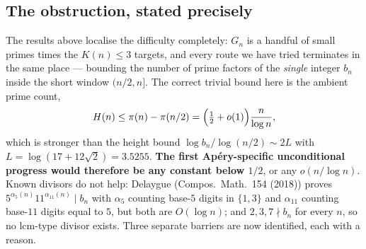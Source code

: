 \subsection{The obstruction, stated precisely}

The results above localise the difficulty completely: $G_n$ is a handful of small primes
times the $K(n)\le3$ targets, and every route we have tried terminates in the same place —
bounding the number of prime factors of the \emph{single} integer $b_n$ inside the short
window $(n/2,n]$.  The correct trivial bound here is the ambient prime count,
\[
  H(n)\le\pi(n)-\pi(n/2)=\Bigl(\tfrac12+o(1)\Bigr)\frac n{\log n},
\]
which is stronger than the height bound $\log b_n/\log(n/2)\sim2L$ with
$L=\log(17+12\sqrt2)=3.5255$.  \textbf{The first Ap\'ery-specific unconditional progress would
therefore be any constant below $1/2$}, or any $o(n/\log n)$.  Known divisors do not help:
Delaygue (Compos.\ Math.\ 154 (2018)) proves $5^{\alpha_5(n)}11^{\alpha_{11}(n)}\mid b_n$ with
$\alpha_5$ counting base-$5$ digits in $\{1,3\}$ and $\alpha_{11}$ counting base-$11$ digits
equal to $5$, but both are $O(\log n)$; and $2,3,7\nmid b_n$ for every $n$, so no
$\mathrm{lcm}$-type divisor exists.  Three separate barriers are now identified, each with a reason.

